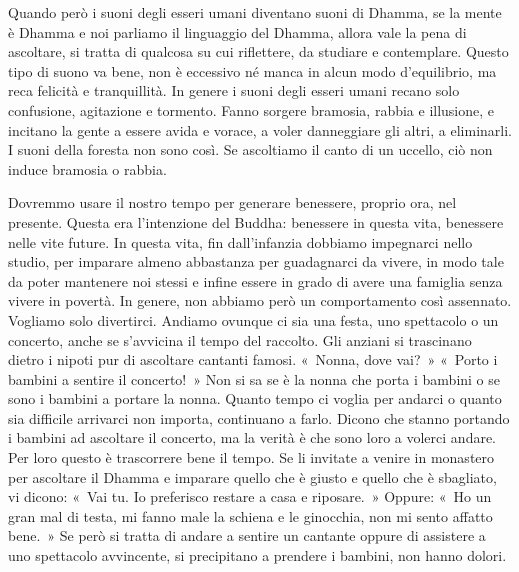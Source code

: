 Quando però i suoni degli esseri umani diventano suoni di Dhamma, se la
mente è Dhamma e noi parliamo il linguaggio del Dhamma, allora vale la
pena di ascoltare, si tratta di qualcosa su cui riflettere, da studiare
e contemplare. Questo tipo di suono va bene, non è eccessivo né manca in
alcun modo d'equilibrio, ma reca felicità e tranquillità. In genere i
suoni degli esseri umani recano solo confusione, agitazione e tormento.
Fanno sorgere bramosia, rabbia e illusione, e incitano la gente a essere
avida e vorace, a voler danneggiare gli altri, a eliminarli. I suoni
della foresta non sono così. Se ascoltiamo il canto di un uccello, ciò
non induce bramosia o rabbia.

Dovremmo usare il nostro tempo per generare benessere, proprio ora, nel
presente. Questa era l'intenzione del Buddha: benessere in questa vita,
benessere nelle vite future. In questa vita, fin dall'infanzia dobbiamo
impegnarci nello studio, per imparare almeno abbastanza per guadagnarci
da vivere, in modo tale da poter mantenere noi stessi e infine essere in
grado di avere una famiglia senza vivere in povertà. In genere, non
abbiamo però un comportamento così assennato. Vogliamo solo divertirci.
Andiamo ovunque ci sia una festa, uno spettacolo o un concerto, anche se
s'avvicina il tempo del raccolto. Gli anziani si trascinano dietro i
nipoti pur di ascoltare cantanti famosi. «~Nonna, dove vai?~» «~Porto i
bambini a sentire il concerto!~» Non si sa se è la nonna che porta i
bambini o se sono i bambini a portare la nonna. Quanto tempo ci voglia
per andarci o quanto sia difficile arrivarci non importa, continuano a
farlo. Dicono che stanno portando i bambini ad ascoltare il concerto, ma
la verità è che sono loro a volerci andare. Per loro questo è
trascorrere bene il tempo. Se li invitate a venire in monastero per
ascoltare il Dhamma e imparare quello che è giusto e quello che è
sbagliato, vi dicono: «~Vai tu. Io preferisco restare a casa e
riposare.~» Oppure: «~Ho un gran mal di testa, mi fanno male la schiena
e le ginocchia, non mi sento affatto bene.~» Se però si tratta di andare
a sentire un cantante oppure di assistere a uno spettacolo avvincente,
si precipitano a prendere i bambini, non hanno dolori.


